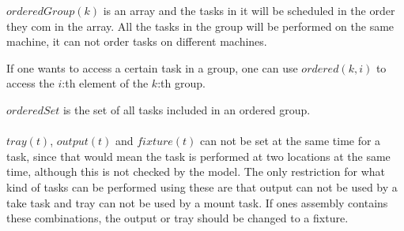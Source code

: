 \documentclass[10pt,a4paper]{report}
\begin{document}
$orderedGroup(k)$ is an array and the tasks in it will be scheduled in the order they com in the array. All the tasks in the group will be performed on the same machine, it can not order tasks on different machines.

If one wants to access a certain task in a group, one can use $ordered(k,i)$ to access the $i$:th element of the $k$:th group.

$orderedSet$ is the set of all tasks included in an ordered group.
\\\\
$tray(t)$, $output(t)$ and $fixture(t)$ can not be set at the same time for a task, since that would mean the task is performed at two locations at the same time, although this is not checked by the model. The only restriction for what kind of tasks can be performed using these are that output can not be used by a take task and tray can not be used by a mount task. If ones assembly contains these combinations, the output or tray should be changed to a fixture.
\end{document}
